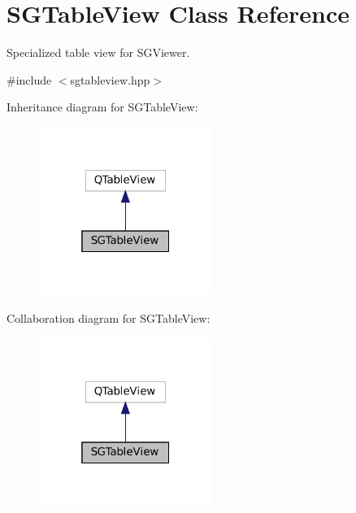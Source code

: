 \hypertarget{classSGTableView}{}\section{S\+G\+Table\+View Class Reference}
\label{classSGTableView}


Specialized table view for S\+G\+Viewer.  




{\ttfamily \#include $<$sgtableview.\+hpp$>$}



Inheritance diagram for S\+G\+Table\+View\+:
\nopagebreak
\begin{figure}[H]
\begin{center}
\leavevmode
\includegraphics[width=160pt]{classSGTableView__inherit__graph}
\end{center}
\end{figure}


Collaboration diagram for S\+G\+Table\+View\+:
\nopagebreak
\begin{figure}[H]
\begin{center}
\leavevmode
\includegraphics[width=160pt]{classSGTableView__coll__graph}
\end{center}
\end{figure}
